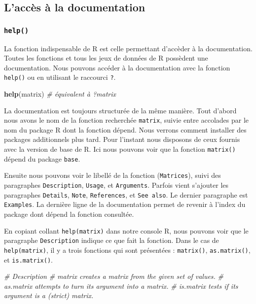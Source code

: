 \documentclass[]{book}
\newenvironment{Shaded}{\begin{snugshade}}{\end{snugshade}}
\newcommand{\KeywordTok}[1]{\textcolor[rgb]{0.13,0.29,0.53}{\textbf{#1}}}
\newcommand{\CommentTok}[1]{\textcolor[rgb]{0.56,0.35,0.01}{\textit{#1}}}
\newcommand{\NormalTok}[1]{#1}
\theoremstyle{definition}
\theoremstyle{definition}
\theoremstyle{definition}
\theoremstyle{remark}
\begin{document}
\subsection{L'accès à la documentation}\label{lacces-a-la-documentation}

\hypertarget{l015help}{\subsubsection{\texorpdfstring{\texttt{help()}}{help()}}\label{l015help}}

La fonction indispensable de R est celle permettant d'accèder à la
documentation. Toutes les fonctions et tous les jeux de données de R
possèdent une documentation. Nous pouvons accéder à la documentation
avec la fonction \texttt{help()} ou en utilisant le raccourci
\texttt{?}.

\begin{Shaded}
\begin{Highlighting}[]
\KeywordTok{help}\NormalTok{(matrix) }\CommentTok{# équivalent à ?matrix}
\end{Highlighting}
\end{Shaded}

La documentation est toujours structurée de la même manière. Tout
d'abord nous avons le nom de la fonction recherchée \texttt{matrix},
suivie entre accolades par le nom du package R dont la fonction dépend.
Nous verrons comment installer des packages additionnels plus tard. Pour
l'instant nous disposons de ceux fournis avec la version de base de R.
Ici nous pouvons voir que la fonction \texttt{matrix()} dépend du
package \texttt{base}.

Ensuite nous pouvons voir le libellé de la fonction (\texttt{Matrices}),
suivi des paragraphes \texttt{Description}, \texttt{Usage}, et
\texttt{Arguments}. Parfois vient s'ajouter les paragraphes
\texttt{Details}, \texttt{Note}, \texttt{References}, et
\texttt{See\ also}. Le dernier paragraphe est \texttt{Examples}. La
dernière ligne de la documentation permet de revenir à l'index du
package dont dépend la fonction consultée.

En copiant collant \texttt{help(matrix)} dans notre console R, nous
pouvons voir que le paragraphe \texttt{Description} indique ce que fait
la fonction. Dans le cas de \texttt{help(matrix)}, il y a trois
fonctions qui sont présentées : \texttt{matrix()}, \texttt{as.matrix()},
et \texttt{is.matrix()}.

\begin{Shaded}
\begin{Highlighting}[]
\CommentTok{# Description}
\CommentTok{# matrix creates a matrix from the given set of values.}
\CommentTok{# as.matrix attempts to turn its argument into a matrix.}
\CommentTok{# is.matrix tests if its argument is a (strict) matrix.}
\end{Highlighting}
\end{Shaded}
\end{document}
